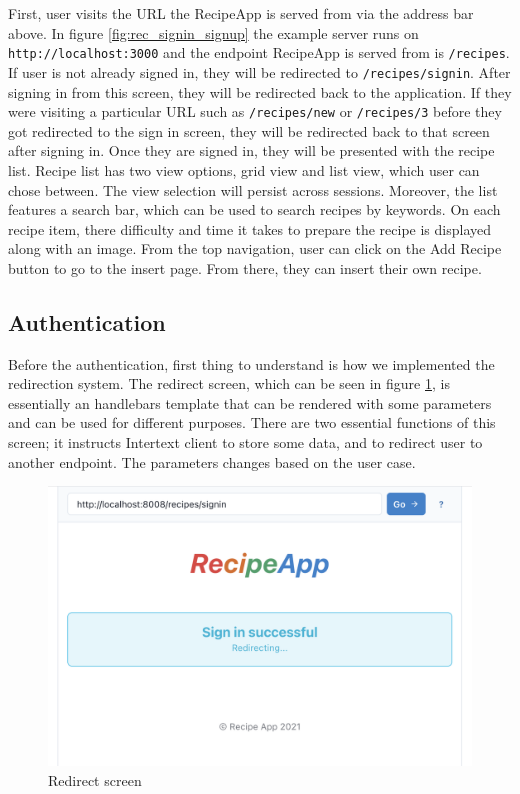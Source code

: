 First, user visits the URL the RecipeApp is served from via the address bar above. In figure \ref{fig:rec_signin_signup} the example server runs on \texttt{http://localhost:3000} and the endpoint RecipeApp is served from is \texttt{/recipes}. If user is not already signed in, they will be redirected to \texttt{/recipes/signin}. After signing in from this screen, they will be redirected back to the application. If they were visiting a particular URL such as \texttt{/recipes/new} or \texttt{/recipes/3} before they got redirected to the sign in screen, they will be redirected back to that screen after signing in. Once they are signed in, they will be presented with the recipe list. Recipe list has two view options, grid view and list view, which user can chose between. The view selection will persist across sessions. Moreover, the list features a search bar, which can be used to search recipes by keywords. On each recipe item, there difficulty and time it takes to prepare the recipe is displayed along with an image. From the top navigation, user can click on the Add Recipe button to go to the insert page. From there, they can insert their own recipe.

\subsection{Authentication}

Before the authentication, first thing to understand is how we implemented the redirection system. The redirect screen, which can be seen in figure \ref{fig:rec_redirect}, is essentially an handlebars template that can be rendered with some parameters and can be used for different purposes. There are two essential functions of this screen; it instructs Intertext client to store some data, and to redirect user to another endpoint. The parameters changes based on the user case.

\begin{figure}[htb]
  \centering
  \includegraphics[width=12.4cm]{thesis/paper/images/rec_redirect.png}
  \caption{Redirect screen}%
  \label{fig:rec_redirect}%
\end{figure}

